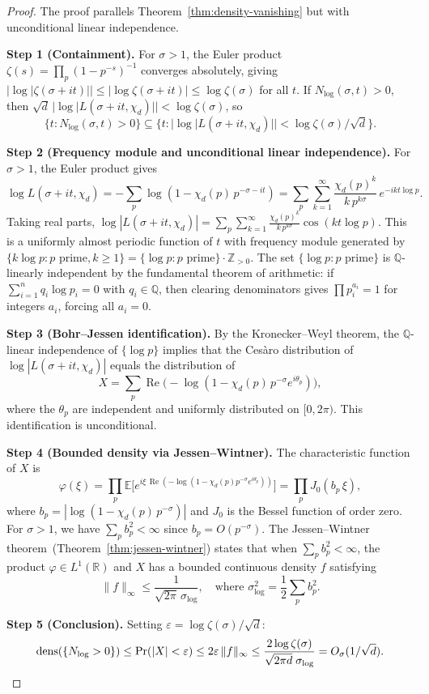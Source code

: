 \documentclass[12pt,reqno]{amsart}
\theoremstyle{plain}
\theoremstyle{definition}
\theoremstyle{remark}
\DeclareMathOperator{\dens}{dens}
\newcommand{\Q}{\mathbb{Q}}
\newcommand{\Z}{\mathbb{Z}}
\newcommand{\R}{\mathbb{R}}
\begin{document}
\begin{proof}
The proof parallels Theorem~\ref{thm:density-vanishing} but with unconditional linear independence.

\medskip\noindent\textbf{Step 1 (Containment).}
For $\sigma > 1$, the Euler product $\zeta(s) = \prod_p(1-p^{-s})^{-1}$ converges absolutely, giving $|\log|\zeta(\sigma+it)|| \leq |\log\zeta(\sigma+it)| \leq \log\zeta(\sigma)$ for all $t$. If $N_{\log}(\sigma,t) > 0$, then $\sqrt{d}\,|\log|L(\sigma+it,\chi_d)|| < \log\zeta(\sigma)$, so
\[
\{t : N_{\log}(\sigma,t) > 0\} \subseteq \{t : |\log|L(\sigma+it,\chi_d)|| < \log\zeta(\sigma)/\sqrt{d}\}.
\]

\medskip\noindent\textbf{Step 2 (Frequency module and unconditional linear independence).}
For $\sigma > 1$, the Euler product gives
\[
\log L(\sigma+it,\chi_d) = -\sum_p \log(1-\chi_d(p)\,p^{-\sigma-it}) = \sum_p \sum_{k=1}^\infty \frac{\chi_d(p)^k}{k\,p^{k\sigma}}\,e^{-ikt\log p}.
\]
Taking real parts, $\log|L(\sigma+it,\chi_d)| = \sum_p \sum_{k=1}^\infty \frac{\chi_d(p)^k}{k\,p^{k\sigma}}\cos(kt\log p)$. This is a uniformly almost periodic function of $t$ with frequency module generated by $\{k\log p : p \text{ prime}, k \geq 1\} = \{\log p : p \text{ prime}\} \cdot \Z_{>0}$. The set $\{\log p : p \text{ prime}\}$ is $\Q$-linearly independent by the fundamental theorem of arithmetic: if $\sum_{i=1}^n q_i \log p_i = 0$ with $q_i \in \Q$, then clearing denominators gives $\prod p_i^{a_i} = 1$ for integers $a_i$, forcing all $a_i = 0$.

\medskip\noindent\textbf{Step 3 (Bohr--Jessen identification).}
By the Kronecker--Weyl theorem, the $\Q$-linear independence of $\{\log p\}$ implies that the Ces\`aro distribution of $\log|L(\sigma+it,\chi_d)|$ equals the distribution of
\[
X = \sum_p \operatorname{Re}\bigl(-\log(1-\chi_d(p)\,p^{-\sigma}e^{i\theta_p})\bigr),
\]
where the $\theta_p$ are independent and uniformly distributed on $[0,2\pi)$. This identification is unconditional.

\medskip\noindent\textbf{Step 4 (Bounded density via Jessen--Wintner).}
The characteristic function of $X$ is
\[
\varphi(\xi) = \prod_p \mathbb{E}\bigl[e^{i\xi\,\operatorname{Re}(-\log(1-\chi_d(p)p^{-\sigma}e^{i\theta_p}))}\bigr] = \prod_p J_0(b_p\,\xi),
\]
where $b_p = |\log(1-\chi_d(p)\,p^{-\sigma})|$ and $J_0$ is the Bessel function of order zero. For $\sigma > 1$, we have $\sum_p b_p^2 < \infty$ since $b_p = O(p^{-\sigma})$. The Jessen--Wintner theorem~(Theorem~\ref{thm:jessen-wintner}) states that when $\sum_p b_p^2 < \infty$, the product $\varphi \in L^1(\R)$ and $X$ has a bounded continuous density $f$ satisfying
\[
\|f\|_\infty \leq \frac{1}{\sqrt{2\pi}\,\sigma_{\log}}, \quad \text{where } \sigma_{\log}^2 = \frac{1}{2}\sum_p b_p^2.
\]

\medskip\noindent\textbf{Step 5 (Conclusion).}
Setting $\varepsilon = \log\zeta(\sigma)/\sqrt{d}$:
\[
\dens(\{N_{\log} > 0\}) \leq \Pr(|X| < \varepsilon) \leq 2\varepsilon\,\|f\|_\infty \leq \frac{2\log\zeta(\sigma)}{\sqrt{2\pi d}\;\sigma_{\log}} = O_\sigma(1/\sqrt{d}). \qedhere
\]
\end{proof}
\end{document}
